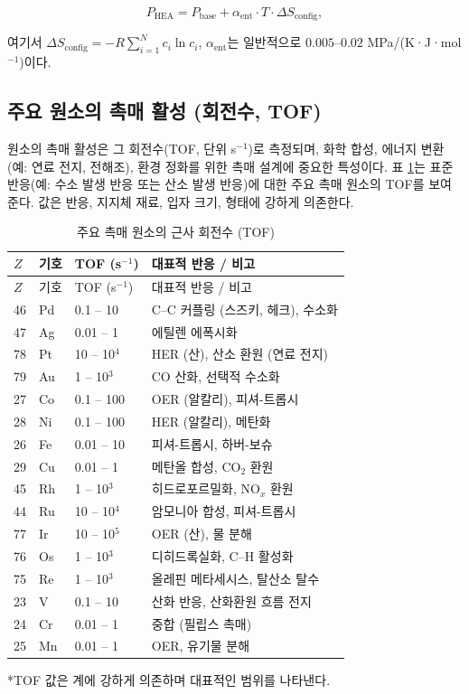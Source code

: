 \documentclass[12pt,a4paper]{article}
\begin{document}
	\begin{equation}
		P_{\text{HEA}} = P_{\text{base}} + \alpha_{\text{ent}} \cdot T \cdot \Delta S_{\text{config}},
		\label{eq:hea}
	\end{equation}
	
	여기서 \(\Delta S_{\text{config}} = -R \sum_{i=1}^{N} c_i \ln c_i\), \(\alpha_{\text{ent}}\)는 일반적으로 \(0.005\)–\(0.02\) MPa/(K·J·mol\(^{-1}\))이다.
	
	\subsection{주요 원소의 촉매 활성 (회전수, TOF)}
	\label{subsec:catalytic-activity}
	
	원소의 촉매 활성은 그 회전수(TOF, 단위 s\(^{-1}\))로 측정되며, 화학 합성, 에너지 변환(예: 연료 전지, 전해조), 환경 정화를 위한 촉매 설계에 중요한 특성이다. 표 \ref{tab:tof-data}는 표준 반응(예: 수소 발생 반응 또는 산소 발생 반응)에 대한 주요 촉매 원소의 TOF를 보여준다. 값은 반응, 지지체 재료, 입자 크기, 형태에 강하게 의존한다.
	
	\begin{longtable}{p{1.2cm}p{1.2cm}p{3.0cm}p{6.5cm}}
		\caption{주요 촉매 원소의 근사 회전수 (TOF)} \label{tab:tof-data} \\
		\toprule
		\(Z\) & 기호 & TOF (s\(^{-1}\)) & 대표적 반응 / 비고 \\
		\midrule
		\endfirsthead
		\toprule
		\(Z\) & 기호 & TOF (s\(^{-1}\)) & 대표적 반응 / 비고 \\
		\midrule
		\endhead
		46 & Pd & 0.1 – 10 & C–C 커플링 (스즈키, 헤크), 수소화 \\
		47 & Ag & 0.01 – 1 & 에틸렌 에폭시화 \\
		78 & Pt & 10 – 10\(^4\) & HER (산), 산소 환원 (연료 전지) \\
		79 & Au & 1 – 10\(^3\) & CO 산화, 선택적 수소화 \\
		27 & Co & 0.1 – 100 & OER (알칼리), 피셔-트롭시 \\
		28 & Ni & 0.1 – 100 & HER (알칼리), 메탄화 \\
		26 & Fe & 0.01 – 10 & 피셔-트롭시, 하버-보슈 \\
		29 & Cu & 0.01 – 1 & 메탄올 합성, CO\(_2\) 환원 \\
		45 & Rh & 1 – 10\(^3\) & 히드로포르밀화, NO\(_x\) 환원 \\
		44 & Ru & 10 – 10\(^4\) & 암모니아 합성, 피셔-트롭시 \\
		77 & Ir & 10 – 10\(^5\) & OER (산), 물 분해 \\
		76 & Os & 1 – 10\(^3\) & 디히드록실화, C–H 활성화 \\
		75 & Re & 1 – 10\(^3\) & 올레핀 메타세시스, 탈산소 탈수 \\
		23 & V  & 0.1 – 10 & 산화 반응, 산화환원 흐름 전지 \\
		24 & Cr & 0.01 – 1 & 중합 (필립스 촉매) \\
		25 & Mn & 0.01 – 1 & OER, 유기물 분해 \\
		\bottomrule
	\end{longtable}
	*TOF 값은 계에 강하게 의존하며 대표적인 범위를 나타낸다.
	
\end{document}
